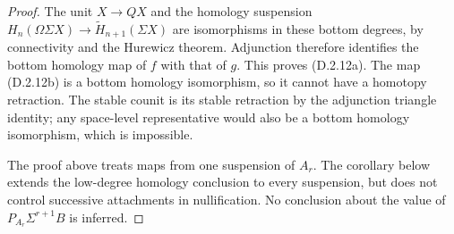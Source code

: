 \begin{proof}
The unit $X\to QX$ and the homology suspension
$H_n(\Omega\Sigma X)\to\widetilde H_{n+1}(\Sigma X)$
are isomorphisms in these bottom degrees, by connectivity and
the Hurewicz theorem. Adjunction therefore identifies the
bottom homology map of $f$ with that of $g$. This proves
\textup{(D.2.12a)}. The map \textup{(D.2.12b)} is a bottom
homology isomorphism, so it cannot have a homotopy retraction.
The stable counit is its stable retraction by the adjunction
triangle identity; any space-level representative would also
be a bottom homology isomorphism, which is impossible.

The proof above treats maps from one suspension of $A_r$.
The corollary below extends the low-degree homology conclusion
to every suspension, but does not control successive attachments
in nullification. No conclusion about the value of
$P_{A_r}\Sigma^{r+1}B$ is inferred.
\end{proof}

